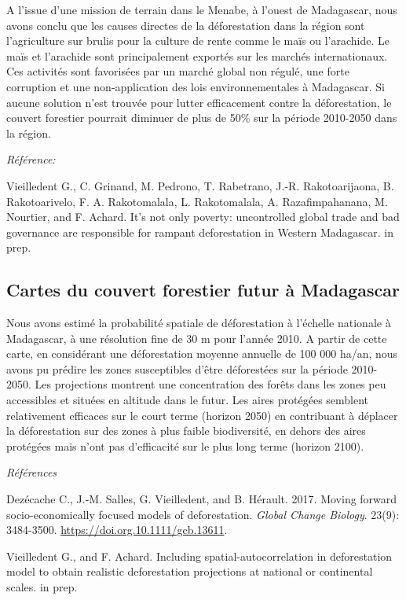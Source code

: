 \documentclass[12pt,]{article}
\begin{document}
A l'issue d'une mission de terrain dans le Menabe, à l'ouest de
Madagascar, nous avons conclu que les causes directes de la
déforestation dans la région sont l'agriculture sur brulis pour la
culture de rente comme le maïs ou l'arachide. Le maïs et l'arachide sont
principalement exportés sur les marchés internationaux. Ces activités
sont favorisées par un marché global non régulé, une forte corruption et
une non-application des lois environnementales à Madagascar. Si aucune
solution n'est trouvée pour lutter efficacement contre la déforestation,
le couvert forestier pourrait diminuer de plus de 50\% sur la période
2010-2050 dans la région.

\emph{Référence:}

Vieilledent G., C. Grinand, M. Pedrono, T. Rabetrano, J.-R.
Rakotoarijaona, B. Rakotoarivelo, F. A. Rakotomalala, L. Rakotomalala,
A. Razafimpahanana, M. Nourtier, and F. Achard. It's not only poverty:
uncontrolled global trade and bad governance are responsible for rampant
deforestation in Western Madagascar. in prep.

\hypertarget{cartes-du-couvert-forestier-futur-a-madagascar}{%
\subsection{Cartes du couvert forestier futur à
Madagascar}\label{cartes-du-couvert-forestier-futur-a-madagascar}}

Nous avons estimé la probabilité spatiale de déforestation à l'échelle
nationale à Madagascar, à une résolution fine de 30 m pour l'année 2010.
A partir de cette carte, en considérant une déforestation moyenne
annuelle de 100 000 ha/an, nous avons pu prédire les zones susceptibles
d'être déforestées sur la période 2010-2050. Les projections montrent
une concentration des forêts dans les zones peu accessibles et situées
en altitude dans le futur. Les aires protégées semblent relativement
efficaces sur le court terme (horizon 2050) en contribuant à déplacer la
déforestation sur des zones à plus faible biodiversité, en dehors des
aires protégées mais n'ont pas d'efficacité sur le plus long terme
(horizon 2100).

\emph{Références}

Dezécache C., J.-M. Salles, G. Vieilledent, and B. Hérault. 2017. Moving
forward socio-economically focused models of deforestation. \emph{Global
Change Biology}. 23(9): 3484-3500.
\url{https://doi.org.10.1111/gcb.13611}.

Vieilledent G., and F. Achard. Including spatial-autocorrelation in
deforestation model to obtain realistic deforestation projections at
national or continental scales. in prep.
\end{document}
